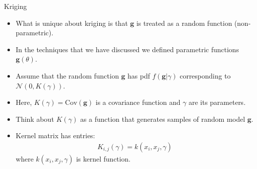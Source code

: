\documentclass[handout,9pt]{beamer}
\begin{document}

\begin{frame}{Kriging}

\begin{itemize}
  \setlength{\itemsep}{10pt}
\item What is unique about kriging is that $\mathbf{g}$ is treated as a random function (non-parametric). 

\item In the techniques that we have discussed we defined parametric functions $\mathbf{g}(\theta)$.

\item Assume that the random function $\mathbf{g}$ has pdf $f(\mathbf{g}|\gamma)$ corresponding to $\mathcal{N}(0,K(\gamma))$.  

\item Here, $K(\gamma)=\textrm{Cov}(\mathbf{g})$ is a covariance function and $\gamma$ are its parameters.  

\item Think about $K(\gamma)$ as a function that generates samples of random model $\mathbf{g}$. 

\item Kernel matrix has entries:
\begin{align*}
K_{i,j}(\gamma)=k(x_i,x_j,\gamma)
\end{align*}
where $k(x_i,x_j,\gamma)$ is kernel function. 

\end{itemize}


\end{frame}

\end{document}
